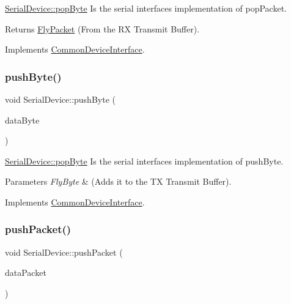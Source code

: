 \hyperlink{class_serial_device_aa48df17f28ab9f613ba07181487a39c9}{Serial\+Device\+::pop\+Byte} Is the serial interface\textquotesingle{}s implementation of pop\+Packet. 

\begin{DoxyReturn}{Returns}
\hyperlink{class_fly_packet}{Fly\+Packet} (From the RX Transmit Buffer). 
\end{DoxyReturn}


Implements \hyperlink{class_common_device_interface_a1b9c96bffa9af46a054e7ce0c341ea19}{Common\+Device\+Interface}.

\hypertarget{class_serial_device_a8ae456ccffcf8afccdfe49357aed3e06}{}\label{class_serial_device_a8ae456ccffcf8afccdfe49357aed3e06} 
\subsubsection{\texorpdfstring{push\+Byte()}{pushByte()}}
{\footnotesize\ttfamily void Serial\+Device\+::push\+Byte (\begin{DoxyParamCaption}\item[{\hyperlink{conversions_8h_a1f006e31a957accfe6aa1bf6f401efce}{Fly\+Byte}}]{data\+Byte }\end{DoxyParamCaption})\hspace{0.3cm}{\ttfamily [virtual]}}



\hyperlink{class_serial_device_aa48df17f28ab9f613ba07181487a39c9}{Serial\+Device\+::pop\+Byte} Is the serial interface\textquotesingle{}s implementation of push\+Byte. 


\begin{DoxyParams}{Parameters}
{\em Fly\+Byte} & (Adds it to the TX Transmit Buffer). \\
\hline
\end{DoxyParams}


Implements \hyperlink{class_common_device_interface_aadb344329a9235fbfa781611b4f769e1}{Common\+Device\+Interface}.

\hypertarget{class_serial_device_a35408d01afb4c48bc259dc601d2b0bf7}{}\label{class_serial_device_a35408d01afb4c48bc259dc601d2b0bf7} 
\subsubsection{\texorpdfstring{push\+Packet()}{pushPacket()}}
{\footnotesize\ttfamily void Serial\+Device\+::push\+Packet (\begin{DoxyParamCaption}\item[{\hyperlink{class_fly_packet}{Fly\+Packet}}]{data\+Packet }\end{DoxyParamCaption})\hspace{0.3cm}{\ttfamily [virtual]}}



